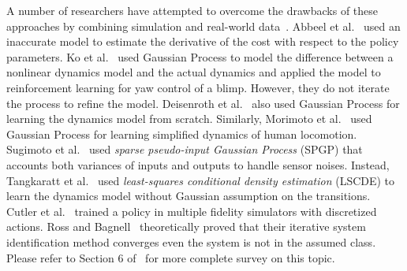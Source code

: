A number of researchers have attempted to overcome the drawbacks of
these approaches by combining simulation and real-world data~\cite{bib-sutton-integrated,bib-moore-prioritized-sweeping,bib-peng-incremental}.
Abbeel et al.~\cite{bib-abbeel-inaccurate} used an inaccurate model to
estimate the derivative of the cost with respect to the policy
parameters.
Ko et al.~\cite{bib-ko-blimp} used Gaussian Process to model the
difference between a nonlinear dynamics model and the actual dynamics
and applied the model to reinforcement learning for yaw control of a
blimp.  However, they do not iterate the process to refine the model.
Deisenroth et al.~\cite{bib-deisenroth-data-efficient} also used
Gaussian Process for learning the dynamics model from scratch.
Similarly, Morimoto et al.~\cite{bib-iros07-improving} used Gaussian
Process for learning simplified dynamics of human locomotion.
Sugimoto et al.~\cite{bib-humanoid13-trajectory} used
\emph{sparse pseudo-input Gaussian Process} (SPGP) that accounts both
variances of inputs and outputs to handle sensor noises.
Instead, Tangkaratt et al.~\cite{bib-nn14-model} used 
\emph{least-squares conditional density estimation} (LSCDE) to learn 
the dynamics model without Gaussian assumption on the transitions.
Cutler et al.~\cite{bib-icra14-reinforcement} trained a policy in 
multiple fidelity simulators with discretized actions.
Ross and Bagnell~\cite{bib-ross-agnostic} theoretically proved that
their iterative system identification method converges even the system
is not in the assumed class.
Please refer to Section 6 of~\cite{bib-kober-survey} for more complete
survey on this topic.

